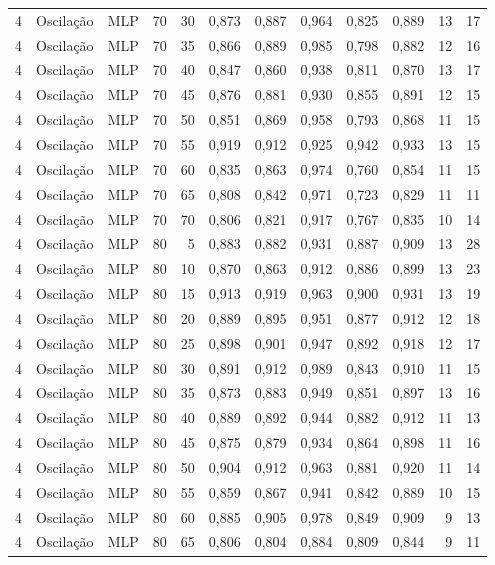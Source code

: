 \begin{longtable}{@{}rllrrrrrrrrr@{}}
4 & Oscilação & MLP & 70 & 30 & 0,873 & 0,887 & 0,964 & 0,825 & 0,889 & 13 & 17 \\
4 & Oscilação & MLP & 70 & 35 & 0,866 & 0,889 & 0,985 & 0,798 & 0,882 & 12 & 16 \\
4 & Oscilação & MLP & 70 & 40 & 0,847 & 0,860 & 0,938 & 0,811 & 0,870 & 13 & 17 \\
4 & Oscilação & MLP & 70 & 45 & 0,876 & 0,881 & 0,930 & 0,855 & 0,891 & 12 & 15 \\
4 & Oscilação & MLP & 70 & 50 & 0,851 & 0,869 & 0,958 & 0,793 & 0,868 & 11 & 15 \\
4 & Oscilação & MLP & 70 & 55 & 0,919 & 0,912 & 0,925 & 0,942 & 0,933 & 13 & 15 \\
4 & Oscilação & MLP & 70 & 60 & 0,835 & 0,863 & 0,974 & 0,760 & 0,854 & 11 & 15 \\
4 & Oscilação & MLP & 70 & 65 & 0,808 & 0,842 & 0,971 & 0,723 & 0,829 & 11 & 11 \\
4 & Oscilação & MLP & 70 & 70 & 0,806 & 0,821 & 0,917 & 0,767 & 0,835 & 10 & 14 \\
4 & Oscilação & MLP & 80 & 5 & 0,883 & 0,882 & 0,931 & 0,887 & 0,909 & 13 & 28 \\
4 & Oscilação & MLP & 80 & 10 & 0,870 & 0,863 & 0,912 & 0,886 & 0,899 & 13 & 23 \\
4 & Oscilação & MLP & 80 & 15 & 0,913 & 0,919 & 0,963 & 0,900 & 0,931 & 13 & 19 \\
4 & Oscilação & MLP & 80 & 20 & 0,889 & 0,895 & 0,951 & 0,877 & 0,912 & 12 & 18 \\
4 & Oscilação & MLP & 80 & 25 & 0,898 & 0,901 & 0,947 & 0,892 & 0,918 & 12 & 17 \\
4 & Oscilação & MLP & 80 & 30 & 0,891 & 0,912 & 0,989 & 0,843 & 0,910 & 11 & 15 \\
4 & Oscilação & MLP & 80 & 35 & 0,873 & 0,883 & 0,949 & 0,851 & 0,897 & 13 & 16 \\
4 & Oscilação & MLP & 80 & 40 & 0,889 & 0,892 & 0,944 & 0,882 & 0,912 & 11 & 13 \\
4 & Oscilação & MLP & 80 & 45 & 0,875 & 0,879 & 0,934 & 0,864 & 0,898 & 11 & 16 \\
4 & Oscilação & MLP & 80 & 50 & 0,904 & 0,912 & 0,963 & 0,881 & 0,920 & 11 & 14 \\
4 & Oscilação & MLP & 80 & 55 & 0,859 & 0,867 & 0,941 & 0,842 & 0,889 & 10 & 15 \\
4 & Oscilação & MLP & 80 & 60 & 0,885 & 0,905 & 0,978 & 0,849 & 0,909 & 9 & 13 \\
4 & Oscilação & MLP & 80 & 65 & 0,806 & 0,804 & 0,884 & 0,809 & 0,844 & 9 & 11 \\

\end{longtable}
